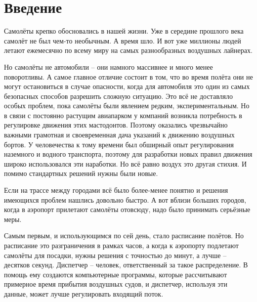 \documentclass[12pt, a4 paper]{article}
\theoremstyle{plain}
\begin{document}

\tableofcontents

\pagestyle{empty} %
\setcounter{page}{2}

\newpage



\section*{Введение}
\pagestyle{plain} %

Самолёты крепко обосновались в нашей жизни. Уже в середине прошлого века самолёт не был чем-то необычным. А время шло. И вот уже миллионы людей летают ежемесячно по всему миру на самых разнообразных воздушных лайнерах.

Но самолёты не автомобили – они намного массивнее и много менее поворотливы. А самое главное отличие состоит в том, что во время полёта они не могут остановиться в случае опасности, когда для автомобиля это один из самых безопасных способов разрешить сложную ситуацию. Это всё не доставляло особых проблем, пока самолёты были явлением редким, экспериментальным. Но в связи с постоянно растущим авиапарком у компаний возникла потребность в регулировке движения этих мастодонтов. Поэтому оказались чрезвычайно важными грамотная и своевременная дача указаний к движению воздушных бортов. У человечества к тому времени был обширный опыт регулирования наземного и водного транспорта, поэтому для разработки новых правил движения широко использовался эти наработки. Но всё равно воздух это другая стихия. И помимо стандартных решений нужны были новые.

Если на трассе между городами всё было более-менее понятно и решения имеющихся проблем нашлись довольно быстро. А вот вблизи больших городов, когда в аэропорт прилетают самолёты отовсюду, надо было принимать серьёзные меры.

Самым первым, и использующимся по сей день, стало расписание полётов. Но расписание это разграничения в рамках часов, а когда к аэропорту подлетают самолёты для посадки, нужны решения с точностью до минут, а лучше – десятков секунд. Диспетчер – человек, ответственный за такое распределение.  В помощь ему создаются компьютерные программы, которые рассчитывают примерное время прибытия воздушных судов, и диспетчер, используя эти данные, может лучше регулировать входящий поток.
\end{document}
